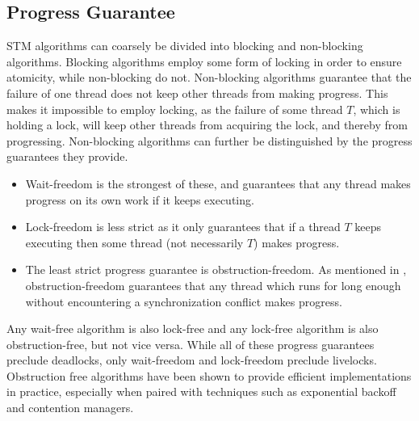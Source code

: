 \subsection{Progress Guarantee}
\ac{STM} algorithms can coarsely be divided into blocking and non-blocking algorithms\cite[p. 47]{harris2010transactional}. Blocking algorithms employ some form of locking in order to ensure atomicity, while non-blocking do not\cite[p. 59]{herlihy2012art}. Non-blocking algorithms guarantee that the failure of one thread does not keep other threads from making progress\cite[p. 47]{harris2010transactional}\cite[p. 142]{herlihy1991wait}\cite[p. 59]{herlihy2012art}. This  makes it impossible to employ locking, as the failure of some thread $T$, which is holding a lock, will keep other threads from acquiring the lock, and thereby from progressing. Non-blocking algorithms can further be distinguished by the progress guarantees they provide. 
\begin{itemize}
	\item Wait-freedom is the strongest of these, and guarantees that any thread makes progress on its own work if it keeps executing\cite[p. 124]{herlihy1991wait}\cite[p. 59]{herlihy2012art}. 
	\item Lock-freedom is less strict as it only guarantees that if a thread $T$ keeps executing then some thread (not necessarily $T$) makes progress\cite[p. 47]{harris2010transactional}\cite[p. 60]{herlihy2012art}. 
	\item The least strict progress guarantee is obstruction-freedom\cite[p. 47]{harris2010transactional}\cite{herlihy2003obstruction}\cite[p. 61]{herlihy2012art}. As mentioned in , obstruction-freedom guarantees that any thread which runs for long enough without encountering a synchronization conflict makes progress\cite[p. 1]{herlihy2003obstruction}. 
\end{itemize}
Any wait-free algorithm is also lock-free and any lock-free algorithm is also obstruction-free, but not vice versa\cite[p. 60]{herlihy2012art}. While all of these progress guarantees preclude deadlocks, only wait-freedom and lock-freedom preclude livelocks\cite[p. 47]{harris2010transactional}. Obstruction free algorithms have been shown to provide efficient implementations in practice\cite[p. 61]{herlihy2012art}, especially when paired with techniques such as exponential backoff\cite[p. 147]{herlihy2012art} and contention managers\cite[p. 51]{harris2010transactional}.

